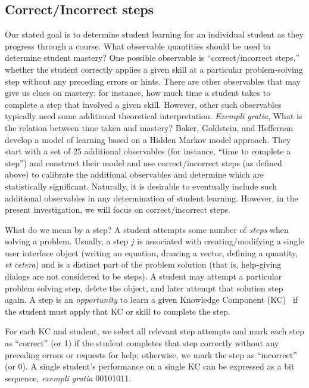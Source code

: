 \documentclass{edm_template}
\begin{document}
\pagebreak
\subsection{Correct/Incorrect steps}

Our stated goal is to determine student learning for an individual
student as they progress through a course.  What observable quantities
should be used to determine student mastery?  One possible observable
is ``correct/incorrect steps,'' whether the student correctly applies
a given skill at a particular problem-solving step without any
preceding errors or hints.  There are other observables that may give
us clues on mastery: for instance, how much time a student takes to
complete a step that involved a given skill.  However, other such
observables typically need some additional theoretical
interpretation. {\em Exempli gratia}, What is the relation between
time taken and mastery?  Baker, Goldstein, and
Heffernan~\citeyear{baker_detecting_2011} develop a model of learning
based on a Hidden Markov model approach.  They start with a set of
25 additional observables (for instance, ``time to complete a step'') and
construct their model and use correct/incorrect steps (as defined
above) to calibrate the additional observables and determine which are
statistically significant.   Naturally, it is
desirable to eventually include such additional observables in any determination
of student learning.   However, in the present investigation,
we will focus on correct/incorrect steps.

What do we mean by a step?
A student attempts some number of {\em steps}  when solving a problem.  
Usually, a step $j$ is associated with creating/modifying a single user
interface object (writing an equation, drawing a vector,
defining a quantity, {\em et cetera}) and is a distinct part of the problem solution
(that is, help-giving dialogs are not considered to be steps).
A student may attempt a particular problem solving
step, delete the object, and later attempt that solution step again.
A step is an {\em opportunity} to learn
a given  Knowledge Component (KC)~\cite{vanlehn_behavior_2006} if the student 
must apply that KC or skill to complete the step.

%
%

For each KC and student, we select all relevant  step attempts and
mark each step as ``correct'' (or 1) if
the student completes that step correctly without any preceding errors or 
requests for help; otherwise, we mark the step as ``incorrect'' (or 0).
\label{steps}  %
A single student's performance on a single KC can be expressed as a bit  sequence,
{\em exempli gratia} 00101011. 
\end{document}

